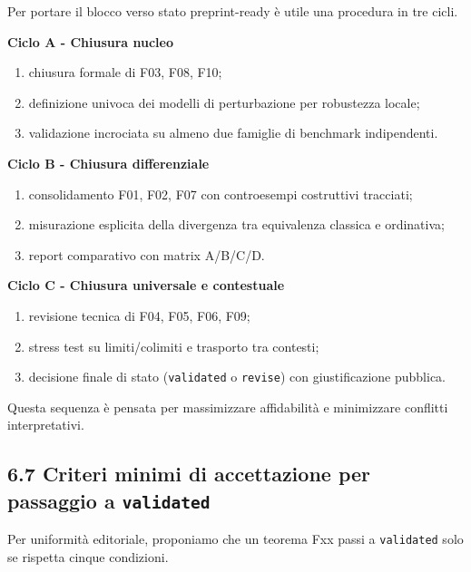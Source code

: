 Per portare il blocco verso stato preprint-ready è utile una procedura in tre cicli.

\textbf{Ciclo A - Chiusura nucleo}

\begin{enumerate}
\def\labelenumi{\arabic{enumi}.}
\tightlist
\item
  chiusura formale di F03, F08, F10;
\item
  definizione univoca dei modelli di perturbazione per robustezza locale;
\item
  validazione incrociata su almeno due famiglie di benchmark indipendenti.
\end{enumerate}

\textbf{Ciclo B - Chiusura differenziale}

\begin{enumerate}
\def\labelenumi{\arabic{enumi}.}
\tightlist
\item
  consolidamento F01, F02, F07 con controesempi costruttivi tracciati;
\item
  misurazione esplicita della divergenza tra equivalenza classica e ordinativa;
\item
  report comparativo con matrix A/B/C/D.
\end{enumerate}

\textbf{Ciclo C - Chiusura universale e contestuale}

\begin{enumerate}
\def\labelenumi{\arabic{enumi}.}
\tightlist
\item
  revisione tecnica di F04, F05, F06, F09;
\item
  stress test su limiti/colimiti e trasporto tra contesti;
\item
  decisione finale di stato (\texttt{validated} o \texttt{revise}) con giustificazione pubblica.
\end{enumerate}

Questa sequenza è pensata per massimizzare affidabilità e minimizzare conflitti interpretativi.

\subsection{\texorpdfstring{6.7 Criteri minimi di accettazione per passaggio a \texttt{validated}}{6.7 Criteri minimi di accettazione per passaggio a validated}}

Per uniformità editoriale, proponiamo che un teorema Fxx passi a \texttt{validated} solo se rispetta cinque condizioni.

